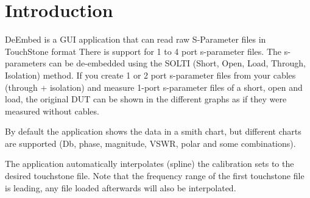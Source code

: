\section{Introduction}
DeEmbed is a GUI application that can read raw S-Parameter files in TouchStone format There is support for 1 to 4 port s-parameter files. The s-parameters can be de-embedded using the SOLTI (Short, Open, Load, Through, Isolation) method. If you create 1 or 2 port s-parameter files from your cables (through + isolation) and measure 1-port s-parameter files of a short, open and load, the original DUT can be shown in the different graphs as if they were measured without cables.

By default the application shows the data in a smith chart, but different charts are supported (Db, phase, magnitude, VSWR, polar and some combinations).

The application automatically interpolates (spline) the calibration sets to the desired touchstone file. Note that the frequency range of the first touchstone file is leading, any file loaded afterwards will also be interpolated.
\newpage